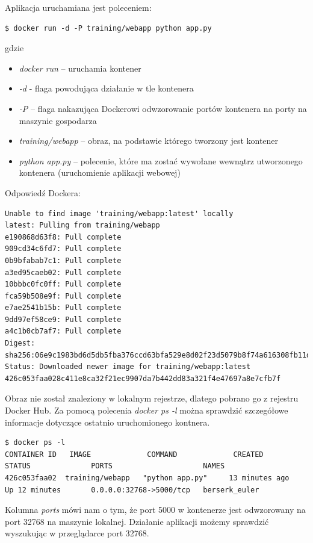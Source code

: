 Aplikacja uruchamiana jest poleceniem:
\begin{lstlisting}[style=incode]
$ docker run -d -P training/webapp python app.py
\end{lstlisting}
gdzie
\begin{itemize}
\item \textit{docker run} – uruchamia kontener
\item \textit{-d} - flaga powodująca działanie w tle kontenera
\item \textit{-P} – flaga nakazująca Dockerowi odwzorowanie portów kontenera na porty na maszynie gospodarza
\item \textit{training/webapp} –  obraz, na podstawie którego tworzony jest kontener
\item \textit{python app.py} – polecenie, które ma zostać wywołane wewnątrz utworzonego kontenera (uruchomienie aplikacji webowej)
\end{itemize}
Odpowiedź Dockera:
\begin{lstlisting}[style=incode]
Unable to find image 'training/webapp:latest' locally
latest: Pulling from training/webapp
e190868d63f8: Pull complete 
909cd34c6fd7: Pull complete 
0b9bfabab7c1: Pull complete 
a3ed95caeb02: Pull complete 
10bbbc0fc0ff: Pull complete 
fca59b508e9f: Pull complete 
e7ae2541b15b: Pull complete 
9dd97ef58ce9: Pull complete 
a4c1b0cb7af7: Pull complete 
Digest: sha256:06e9c1983bd6d5db5fba376ccd63bfa529e8d02f23d5079b8f74a616308fb11d
Status: Downloaded newer image for training/webapp:latest
426c053faa028c411e8ca32f21ec9907da7b442dd83a321f4e47697a8e7cfb7f
\end{lstlisting}
Obraz nie został znaleziony w lokalnym rejestrze, dlatego pobrano go z rejestru Docker Hub. Za pomocą polecenia \textit{docker ps -l} można sprawdzić szczegółowe informacje dotyczące ostatnio uruchomionego kontnera.
\begin{lstlisting}[style=incode]
 $ docker ps -l
CONTAINER ID   IMAGE             COMMAND             CREATED             
STATUS              PORTS                     NAMES
426c053faa02  training/webapp   "python app.py"     13 minutes ago      
Up 12 minutes       0.0.0.0:32768->5000/tcp   berserk_euler
\end{lstlisting}
Kolumna \textit{ports} mówi nam o tym, że port 5000 w kontenerze jest odwzorowany na port 32768 na maszynie lokalnej. Działanie aplikacji możemy sprawdzić wyszukując w przeglądarce port  32768.
